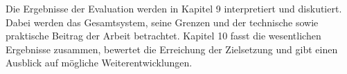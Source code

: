Die Ergebnisse der Evaluation werden in Kapitel 9 interpretiert und diskutiert. Dabei werden das Gesamtsystem, seine Grenzen und der technische sowie praktische Beitrag der Arbeit betrachtet. Kapitel 10 fasst die wesentlichen Ergebnisse zusammen, bewertet die Erreichung der Zielsetzung und gibt einen Ausblick auf mögliche Weiterentwicklungen.
